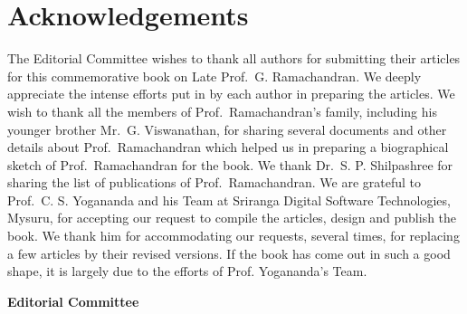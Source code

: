 \chapter*{Acknowledgements}

The Editorial Committee wishes to thank all authors for submitting their articles for this commemorative book on Late Prof.\ G. Ramachandran. We deeply appreciate the intense efforts put in by each author in preparing the articles. We wish to thank all the members of Prof.\ Ramachandran's family, including his younger brother Mr.\ G. Viswanathan, for sharing several documents and other details about Prof.\ Ramachandran which helped us in preparing a biographical sketch of Prof.\ Ramachandran for the book. We thank Dr.\ S. P. Shilpashree for sharing the list of publications of Prof.\ Ramachandran. We are grateful to Prof.\ C. S. Yogananda and his Team at Sriranga Digital Software Technologies, Mysuru, for accepting our request to compile the articles, design and publish the book. We thank him for accommodating our requests, several times, for replacing a few articles by their revised versions. If the book has come out in such a good shape, it is largely due to the efforts of Prof. Yogananda's Team.  
\bigskip

\hfill	{\bf Editorial Committee}
